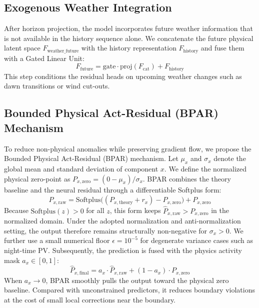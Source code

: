 \subsection{Exogenous Weather Integration}
After horizon projection, the model incorporates future weather information that is not available in the history sequence alone. We concatenate the future physical latent space $F_{\text{weather\_future}}$ with the history representation $F_{\text{history}}$ and fuse them with a Gated Linear Unit:
\begin{equation}
    F_{\text{future}} = \text{gate} \cdot \text{proj}(F_{\text{cat}}) + F_{\text{history}}
\end{equation}
This step conditions the residual heads on upcoming weather changes such as dawn transitions or wind cut-outs.

\subsection{Bounded Physical Act-Residual (BPAR) Mechanism} \label{subsec:bpar}
To reduce non-physical anomalies while preserving gradient flow, we propose the Bounded Physical Act-Residual (BPAR) mechanism. Let $\mu_x$ and $\sigma_x$ denote the global mean and standard deviation of component $x$. We define the normalized physical zero-point as $P_{x,\text{zero}} = (0 - \mu_x) / \sigma_x$. BPAR combines the theory baseline and the neural residual through a differentiable Softplus form:
\begin{equation}
    \hat{P}_{x,\text{raw}} = \text{Softplus}\Big((P_{x,\text{theory}} + r_x) - P_{x,\text{zero}}\Big) + P_{x,\text{zero}}
\label{eq:bpar}
\end{equation}
Because $\text{Softplus}(z) > 0$ for all $z$, this form keeps $\hat{P}_{x,\text{raw}} > P_{x,\text{zero}}$ in the normalized domain. Under the adopted normalization and anti-normalization setting, the output therefore remains structurally non-negative for $\sigma_x > 0$. We further use a small numerical floor $\epsilon=10^{-5}$ for degenerate variance cases such as night-time PV.
Subsequently, the prediction is fused with the physics activity mask $a_x \in [0, 1]$:
\begin{equation}
    \hat{P}_{x,\text{final}} = a_x \cdot \hat{P}_{x,\text{raw}} + (1 - a_x) \cdot P_{x,\text{zero}}
\label{eq:activity_mask}
\end{equation}
When $a_x \to 0$, BPAR smoothly pulls the output toward the physical zero baseline. Compared with unconstrained predictors, it reduces boundary violations at the cost of small local corrections near the boundary.

